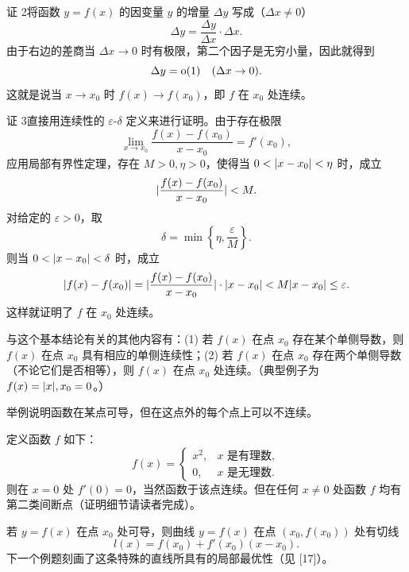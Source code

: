 \begin{xproof}
证 2\quad 将函数 $y=f(x)$ 的因变量 $y$ 的增量 $\Delta y$ 写成（$\Delta x\ne0$）
\[
  \Delta y=\frac{\Delta y}{\Delta x}\cdot\Delta x.
\]
由于右边的差商当 $\Delta x\to0$ 时有极限，第二个因子是无穷小量，因此就得到
\[
  \Delta y=\mathrm{o}(1)\quad(\Delta x\to0).
\]
这就是说当 $x\to x_0$ 时 $f(x)\to f(x_0)$，即 $f$ 在 $x_0$ 处连续。
\end{xproof}

\begin{xproof}
证 3\quad 直接用连续性的 $\varepsilon$-$\delta$ 定义来进行证明。由于存在极限
\[
  \lim_{x\to x_0}\frac{f(x)-f(x_0)}{x-x_0}=f'(x_0),
\]
应用局部有界性定理，存在 $M>0,\eta>0$，使得当 $0<\lvert x-x_0\rvert<\eta$ 时，成立
\[
  \lvert\frac{f(x)-f(x_0)}{x-x_0}\rvert<M.
\]
对给定的 $\varepsilon>0$，取
\[
  \delta=\min\left\{\eta,\frac{\varepsilon}{M}\right\}.
\]
则当 $0<\lvert x-x_0\rvert<\delta$ 时，成立
\[
  \lvert f(x)-f(x_0)\rvert
  =\lvert\frac{f(x)-f(x_0)}{x-x_0}\rvert\cdot\lvert x-x_0\rvert
  <M\lvert x-x_0\rvert\le\varepsilon.
\]
这样就证明了 $f$ 在 $x_0$ 处连续。
\end{xproof}

\begin{xremark}
与这个基本结论有关的其他内容有：(1) 若 $f(x)$ 在点 $x_0$ 存在某个单侧导数，则 $f(x)$ 在点 $x_0$ 具有相应的单侧连续性；(2) 若 $f(x)$ 在点 $x_0$ 存在两个单侧导数（不论它们是否相等），则 $f(x)$ 在点 $x_0$ 处连续。（典型例子为 $f(x)=\lvert x\rvert,x_0=0$。）
\end{xremark}

\begin{xexample}[6.1.2]
举例说明函数在某点可导，但在这点外的每个点上可以不连续。
\end{xexample}
\begin{xsolution}
定义函数 $f$ 如下：
\[
  f(x)=
  \begin{cases}
    x^2, & x\text{ 是有理数},\\
    0,   & x\text{ 是无理数}.
  \end{cases}
\]
则在 $x=0$ 处 $f'(0)=0$，当然函数于该点连续。但在任何 $x\ne0$ 处函数 $f$ 均有第二类间断点（证明细节请读者完成）。
\end{xsolution}

若 $y=f(x)$ 在点 $x_0$ 处可导，则曲线 $y=f(x)$ 在点 $(x_0,f(x_0))$ 处有切线
\[
  l(x)=f(x_0)+f'(x_0)(x-x_0).
\]
下一个例题刻画了这条特殊的直线所具有的局部最优性（见 [17]）。

